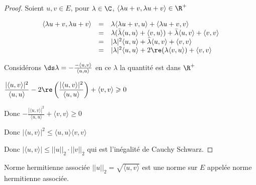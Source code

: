 \begin{proof}
    Soient $u, v \in E$, pour $\lambda \in \C$, $\langle\lambda u + v, \lambda u + v\rangle \in \R^+ $

    $$
    \begin{array}{rcl}
        \langle\lambda u + v, \lambda u + v\rangle & = & \lambda \langle\lambda u + v, u \rangle + \langle\lambda u + v, v\rangle \\
        \space & = & \lambda (\bar \lambda \langle u, u \rangle + \langle v, u \rangle ) + \bar \lambda \langle u, v \rangle + \langle v, v \rangle \\
        \space & = & |\lambda|^2 \langle u, u \rangle + \bar \lambda  \langle u, v \rangle + \langle v, v \rangle \\
        \space & = & |\lambda|^2 \langle u, u \rangle + 2 \re(\lambda \langle v, u \rangle) + \langle v, v \rangle \\
    \end{array}
    $$

    Considérons $\ds \lambda = - \frac{- \langle u, v \rangle }{\langle u, u \rangle}$ en ce $\lambda$ la quantité est dans
    $\R^+$

    $\displaystyle \frac{|\langle u, v \rangle|^2}{\langle u, u \rangle} - 2 \re \left(\frac{|\langle u, v \rangle|^2}{\langle u, u \rangle}\right) + \langle v, v \rangle \geqslant 0$

    Donc $\displaystyle - \frac{|\langle u, v \rangle|^2}{\langle u, u \rangle} + \langle v, v \rangle \geqslant 0$

    Donc $|\langle u, v \rangle|^2 \leqslant \langle u, u \rangle \langle v, v \rangle$

    Donc $|\langle u, v \rangle| \leqslant ||u||_2 \cdot ||v||_2$ qui est l'inégalité de Cauchy Schwarz. 

\end{proof}

\begin{theoreme}{Norme hermitienne associée}{}
    $||u||_2 = \sqrt{\langle u, v \rangle}$ est une norme sur $E$ appelée norme hermitienne associée. 
\end{theoreme}

